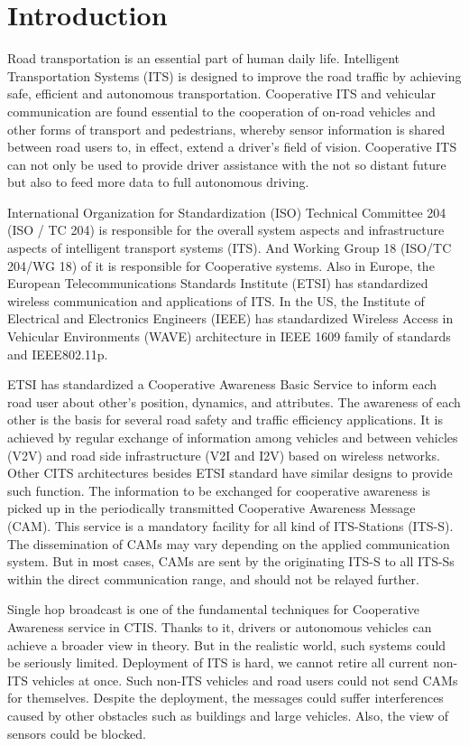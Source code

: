 \section{Introduction} \label{sec:intro}

Road transportation is an essential part of human daily life.
Intelligent Transportation Systems (ITS) is designed to improve the road traffic by achieving safe,
efficient and autonomous transportation.
Cooperative ITS and vehicular communication are found essential to the
cooperation of on-road vehicles and other forms of transport and pedestrians,
whereby sensor information is shared between road users to,
in effect, extend a driver’s field of vision.
Cooperative ITS can not only be used to provide driver assistance with the not so distant future
but also to feed more data to full autonomous driving.

International Organization for Standardization (ISO) Technical Committee 204 (ISO / TC 204)
is responsible for the overall system aspects and infrastructure aspects of intelligent transport systems (ITS).
And Working Group 18 (ISO/TC 204/WG 18) of it is responsible for Cooperative systems.
Also in Europe, the European Telecommunications Standards Institute (ETSI) has standardized wireless communication and applications of ITS.
In the US, the Institute of Electrical and Electronics Engineers (IEEE) has standardized Wireless Access
in Vehicular Environments (WAVE) architecture in IEEE 1609 family of standards and IEEE802.11p.

ETSI has standardized a Cooperative Awareness Basic Service to inform each road user about other's position, dynamics, and attributes.
The awareness of each other is the basis for several road safety and traffic efficiency applications.
It is achieved by regular exchange of information among vehicles and between vehicles (V2V)
and road side infrastructure (V2I and I2V) based on wireless networks.
Other CITS architectures besides ETSI standard have similar designs to provide such function.
The information to be exchanged for cooperative awareness is picked up in the periodically transmitted Cooperative Awareness Message (CAM).
This service is a mandatory facility for all kind of ITS-Stations (ITS-S).
The dissemination of CAMs may vary depending on the applied communication system.
But in most cases, CAMs are sent by the originating ITS-S to all ITS-Ss within the direct communication range,
and should not be relayed further.

Single hop broadcast is one of the fundamental techniques for Cooperative Awareness service in CTIS.
Thanks to it, drivers or autonomous vehicles can achieve a broader view in theory.
But in the realistic world, such systems could be seriously limited.
Deployment of ITS is hard, we cannot retire all current non-ITS vehicles at once.
Such non-ITS vehicles and road users could not send CAMs for themselves.
Despite the deployment, the messages could suffer interferences caused by other obstacles such as buildings and large vehicles.
Also, the view of sensors could be blocked.


